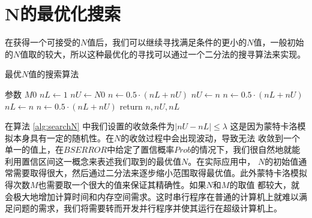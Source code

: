 \section{N的最优化搜索}
\label{sec:researchN}
在获得一个可接受的$N$值后，我们可以继续寻找满足条件的更小的$N$值，一般初始的$N$值取的较大，所以这种最优化的寻找可以通过一个二分法的搜寻算法来实现。
\begin{algorithm}
	\caption{最优$N$值的搜索算法}
	\label{alg:searchN}
	\begin{algorithmic}[1]
		\State 参数 $M0$ 
		 
		\State $nL \gets 1$  
		\State $nU \gets N0$ 
		\State $n \gets 0.5\cdot (nL + nU)$
		 
		\State $nU \gets n$
		\State $n \gets 0.5\cdot(nL + nU)$ 		
		\Else  {}
		\State $nL \gets n$
		\State $n \gets 0.5\cdot(nL + nU)$ 		
		\EndIf
		\EndWhile
		\State return $n, nU, nL$
		\EndProcedure
	\end{algorithmic}
\end{algorithm}
在算法 \ref{alg:searchN} 中我们设置的收敛条件为$|nU - nL| \le \lambda$ 这是因为蒙特卡洛模拟本身具有一定的随机性。在$N$的收敛过程中会出现波动，导致无法
收敛到一个单一的值上，在$BSERROR$中给定了置信概率$Prob$的情况下，我们很自然地就能利用置信区间这一概念来表述我们取到的最优值$N$。在实际应用中，
$N$的初始值通常需要取得很大，然后通过二分法来逐步缩小范围取得最优值。此外蒙特卡洛模拟得次数$M$也需要取一个很大的值来保证其精确性。如果$N$和$M$的取值
都较大，就会极大地增加计算时间和内存空间需求。这时串行程序在普通的计算机上就难以满足问题的需求，我们将需要转而开发并行程序并使其运行在超级计算机上。
